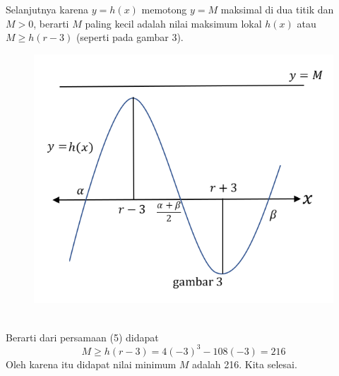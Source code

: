 \documentclass{article}
\begin{document}
	Selanjutnya karena $y=h(x)$ memotong $y=M$ maksimal di dua titik dan $M>0$, berarti $M$ paling kecil adalah nilai maksimum lokal $h(x)$ atau $M \ge h(r-3)$ (seperti pada gambar 3). 
	\begin{figure}[h]
		\centering
		\includegraphics[width=0.3\textheight]{17(6)}
	\end{figure}
	\\
	Berarti dari persamaan (5) didapat
	$$M \ge h(r-3)=4(-3)^3-108(-3)=216$$
	Oleh karena itu didapat nilai minimum $M$ adalah 216. Kita selesai.
	
	
\end{document}
